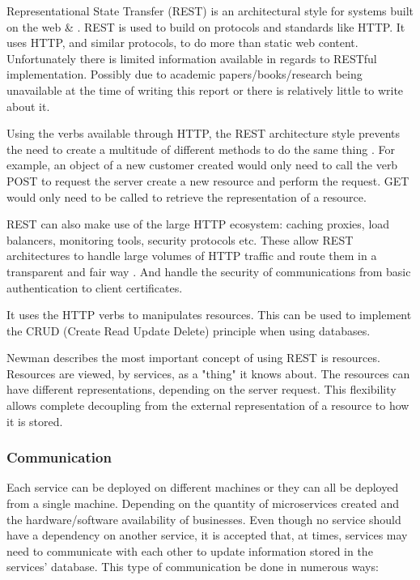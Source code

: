 Representational State Transfer (REST) is an architectural style for systems built on the web \cite{SchroderMSA} \& \cite{NewmanMSA}. REST is used to build on protocols and standards like HTTP.  It uses HTTP, and similar protocols, to do more than static web content. Unfortunately there is limited information available in regards to RESTful implementation. Possibly due to academic papers/books/research being unavailable at the time of writing this report or there is relatively little to write about it.

Using the verbs available through HTTP, the REST architecture style prevents the need to create a multitude of different methods to do the same thing \cite{NewmanMSA}. For example, an object of a new customer created would only need to call the verb POST to request the server create a new resource and perform the request. GET would only need to be called to retrieve the representation of a resource. 

REST can also make use of the large HTTP ecosystem: caching proxies, load balancers, monitoring tools, security protocols etc. These allow REST architectures to handle large volumes of HTTP traffic and route them in a transparent and fair way \cite{NewmanMSA}. And handle the security of communications from basic authentication to client certificates.

It uses the HTTP verbs to manipulates resources. This can be used to implement the CRUD (Create Read Update Delete) principle when using databases.

Newman \cite{NewmanMSA} describes the most important concept of using REST is resources. Resources are viewed, by services, as a "thing" it knows about. The resources can have different representations, depending on the server request. This flexibility allows complete decoupling from the external representation of a resource to how it is stored.

\subsubsection{Communication}
Each service can be deployed on different machines or they can all be deployed from a single machine. Depending on the quantity of microservices created and the hardware/software availability of businesses.
Even though no service should have a dependency on another service, it is accepted that, at times, services may need to communicate with each other to update information stored in the services’ database. This type of communication be done in numerous ways:
